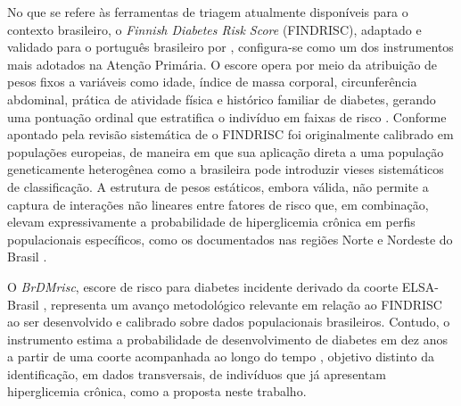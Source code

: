 No que se refere às ferramentas de triagem atualmente disponíveis para o contexto brasileiro, o \textit{Finnish Diabetes Risk Score} (FINDRISC), adaptado e validado para o português brasileiro por \textcite{conceiccao2020translation}, configura-se como um dos instrumentos mais adotados na Atenção Primária. O escore opera por meio da atribuição de pesos fixos a variáveis como idade, índice de massa corporal, circunferência abdominal, prática de atividade física e histórico familiar de diabetes, gerando uma pontuação ordinal que estratifica o indivíduo em faixas de risco \cite{conceiccao2020translation}. Conforme apontado pela revisão sistemática de \textcite{CarrilloLarco2020} o FINDRISC foi originalmente calibrado em populações europeias, de maneira em que sua aplicação direta a uma população geneticamente heterogênea como a brasileira pode introduzir vieses sistemáticos de classificação. A estrutura de pesos estáticos, embora válida, não permite a captura de interações não lineares entre fatores de risco que, em combinação, elevam expressivamente a probabilidade de hiperglicemia crônica em perfis populacionais específicos, como os documentados nas regiões Norte e Nordeste do Brasil \cite{muzy2021prevalencia}.

O \textit{BrDMrisc}, escore de risco para diabetes incidente derivado da coorte ELSA-Brasil \cite{bracco2026brdmrisc}, representa um avanço metodológico relevante em relação ao FINDRISC ao ser desenvolvido e calibrado sobre dados populacionais brasileiros. Contudo, o instrumento estima a probabilidade de desenvolvimento de diabetes em dez anos a partir de uma coorte acompanhada ao longo do tempo \cite{bracco2026brdmrisc}, objetivo distinto da identificação, em dados transversais, de indivíduos que já apresentam hiperglicemia crônica, como a proposta neste trabalho.

